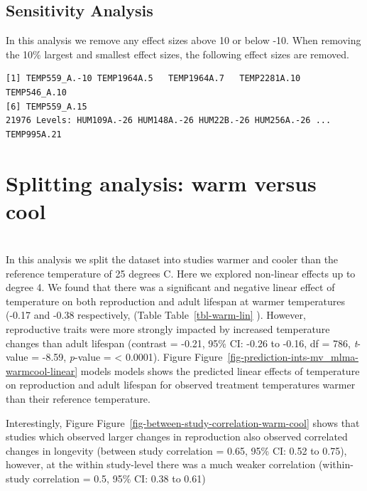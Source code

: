 \documentclass[
  letterpaper,
  DIV=11,
  numbers=noendperiod]{scrartcl}
\begin{document}
\subsection{Sensitivity Analysis}\label{sensitivity-analysis}

In this analysis we remove any effect sizes above 10 or below -10. When
removing the 10\% largest and smallest effect sizes, the following
effect sizes are removed.

\begin{verbatim}
[1] TEMP559_A.-10 TEMP1964A.5   TEMP1964A.7   TEMP2281A.10  TEMP546_A.10 
[6] TEMP559_A.15 
21976 Levels: HUM109A.-26 HUM148A.-26 HUM22B.-26 HUM256A.-26 ... TEMP995A.21
\end{verbatim}

\section{Splitting analysis: warm versus
cool}\label{splitting-analysis-warm-versus-cool}

\section{}\label{section}

In this analysis we split the dataset into studies warmer and cooler
than the reference temperature of 25 degrees C. Here we explored
non-linear effects up to degree 4. We found that there was a significant
and negative linear effect of temperature on both reproduction and adult
lifespan at warmer temperatures (-0.17 and -0.38 respectively, (Table
Table~\ref{tbl-warm-lin} ). However, reproductive traits were more
strongly impacted by increased temperature changes than adult lifespan
(contrast = -0.21, 95\% CI: -0.26 to -0.16, df = 786, \emph{t}-value =
-8.59, \emph{p}-value = \textless{} 0.0001). Figure
Figure~\ref{fig-prediction-ints-mv_mlma-warmcool-linear} models models
shows the predicted linear effects of temperature on reproduction and
adult lifespan for observed treatment temperatures warmer than their
reference temperature.

Interestingly, Figure
Figure~\ref{fig-between-study-correlation-warm-cool} shows that studies
which observed larger changes in reproduction also observed correlated
changes in longevity (between study correlation = 0.65, 95\% CI: 0.52 to
0.75), however, at the within study-level there was a much weaker
correlation (within-study correlation = 0.5, 95\% CI: 0.38 to 0.61)
\end{document}
